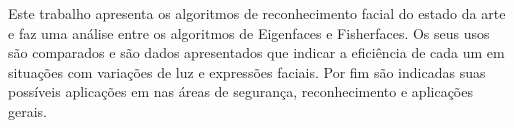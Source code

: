 	Este trabalho apresenta os algoritmos de reconhecimento facial do estado da arte e faz uma análise entre os algoritmos de Eigenfaces e Fisherfaces. Os seus usos são comparados e são dados apresentados que indicar a eficiência de cada um em situações com variações de luz e expressões faciais. Por fim são indicadas suas possíveis aplicações em nas áreas de segurança, reconhecimento e aplicações gerais.


